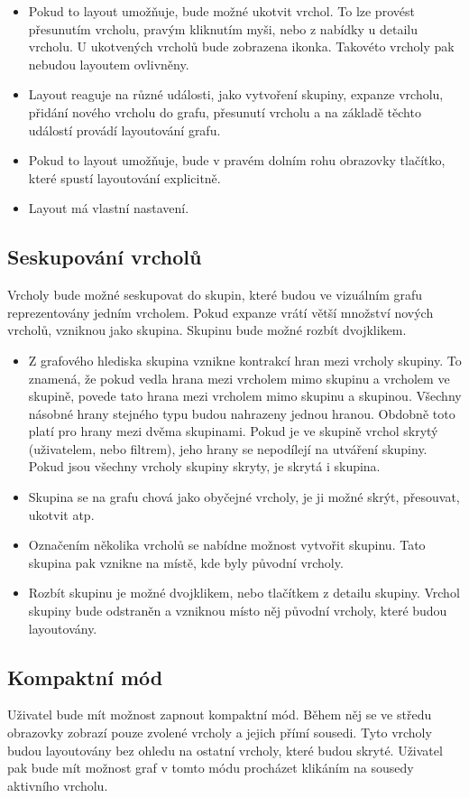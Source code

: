 \begin{itemize}
    \item Pokud to layout umožňuje, bude možné ukotvit vrchol. To lze provést přesunutím vrcholu, pravým kliknutím myši, nebo z nabídky u detailu vrcholu. U ukotvených vrcholů bude zobrazena ikonka. Takovéto vrcholy pak nebudou layoutem ovlivněny.
    \item Layout reaguje na různé události, jako vytvoření skupiny, expanze vrcholu, přidání nového vrcholu do grafu, přesunutí vrcholu a na základě těchto událostí provádí layoutování grafu.
    \item Pokud to layout umožňuje, bude v pravém dolním rohu obrazovky tlačítko, které spustí layoutování explicitně.
    \item Layout má vlastní nastavení.
\end{itemize}

\subsection*{Seskupování vrcholů}
Vrcholy bude možné seskupovat do skupin, které budou ve vizuálním grafu reprezentovány jedním vrcholem. Pokud expanze vrátí větší množství nových vrcholů, vzniknou jako skupina. Skupinu bude možné rozbít dvojklikem.

\begin{itemize}
    \item Z grafového hlediska skupina vznikne kontrakcí hran mezi vrcholy skupiny. To znamená, že pokud vedla hrana mezi vrcholem mimo skupinu a vrcholem ve skupině, povede tato hrana mezi vrcholem mimo skupinu a skupinou. Všechny násobné hrany stejného typu budou nahrazeny jednou hranou. Obdobně toto platí pro hrany mezi dvěma skupinami. Pokud je ve skupině vrchol skrytý (uživatelem, nebo filtrem), jeho hrany se nepodílejí na utváření skupiny. Pokud jsou všechny vrcholy skupiny skryty, je skrytá i skupina.
    \item Skupina se na grafu chová jako obyčejné vrcholy, je ji možné skrýt, přesouvat, ukotvit atp.
    \item Označením několika vrcholů se nabídne možnost vytvořit skupinu. Tato skupina pak vznikne na místě, kde byly původní vrcholy.
    \item Rozbít skupinu je možné dvojklikem, nebo tlačítkem z detailu skupiny. Vrchol skupiny bude odstraněn a vzniknou místo něj původní vrcholy, které budou layoutovány.
\end{itemize}

\subsection*{Kompaktní mód}
Uživatel bude mít možnost zapnout kompaktní mód. Během něj se ve středu obrazovky zobrazí pouze zvolené vrcholy a jejich přímí sousedi. Tyto vrcholy budou layoutovány bez ohledu na ostatní vrcholy, které budou skryté. Uživatel pak bude mít možnost graf v tomto módu procházet klikáním na sousedy aktivního vrcholu.

